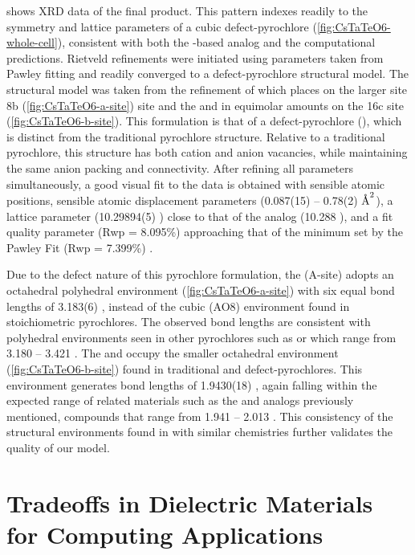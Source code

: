 \documentclass{article}
\newcommand{\CsTaTeO}[1][]{\ch{CsTaTeO6#1}}
\newcommand{\A}{\protect\text{Å}} %
\begin{document}
 shows XRD data of the final \CsTaTeO{} product.
This pattern indexes readily to the symmetry and lattice parameters of a cubic defect-pyrochlore (\cref{fig:CsTaTeO6-whole-cell}), consistent with both the -based analog and the computational predictions.
Rietveld refinements were initiated using parameters taken from Pawley fitting and readily converged to a defect-pyrochlore structural model.
The structural model was taken from the refinement of  which places  on the larger site 8b (\cref{fig:CsTaTeO6-a-site}) site and the  and  in equimolar amounts on the 16c site (\cref{fig:CsTaTeO6-b-site}).
This formulation is that of a defect-pyrochlore (), which is distinct from the traditional  pyrochlore structure.
Relative to a traditional pyrochlore, this structure has both cation and anion vacancies, while maintaining the same anion packing and  connectivity.
After refining all parameters simultaneously, a good visual fit to the data is obtained with sensible atomic positions, sensible atomic displacement parameters (0.087(15) – 0.78(2) $\A^2$), a lattice parameter (10.29894(5) \A) close to that of the  analog (10.288 \A), and a fit quality parameter (Rwp = 8.095\%) approaching that of the minimum set by the Pawley Fit (Rwp = 7.399\%) \cite{galati_cation_2008}.

Due to the defect nature of this pyrochlore formulation, the  (A-site) adopts an octahedral polyhedral environment (\cref{fig:CsTaTeO6-a-site}) with six equal bond lengths of 3.183(6) \A, instead of the cubic (AO8) environment found in stoichiometric  pyrochlores.
The observed bond lengths are consistent with  polyhedral environments seen in other  pyrochlores such as  or  which range from 3.180 – 3.421 \A \cite{galati_cation_2008,fukina_crystal_2019}.
The  and  occupy the smaller octahedral environment (\cref{fig:CsTaTeO6-b-site}) found in traditional and defect-pyrochlores.
This environment generates bond lengths of 1.9430(18) \A, again falling within the expected range of related materials such as the  and  analogs previously mentioned, compounds that range from 1.941 – 2.013 \A.
This consistency of the structural environments found in \CsTaTeO{} with similar chemistries further validates the quality of our model.

\section{Tradeoffs in Dielectric Materials for Computing Applications}
\end{document}
